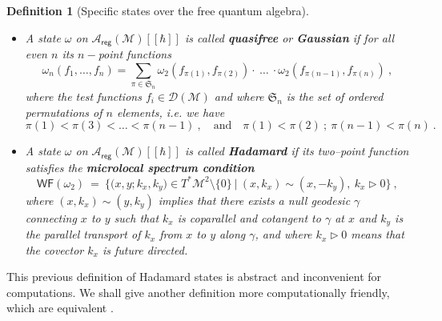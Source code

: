 \documentclass[11pt]{book}
\newcommand{\WF}{\mathsf{WF}}
\newcommand{\reg}{\mathsf{reg}}
\newcommand{\Acal}{\mathcal{A}}
\newcommand{\Dcal}{\mathcal{D}}
\newcommand{\Mcal}{\mathcal{M}}
\newcommand{\Srak}{\mathfrak{S}}
\theoremstyle{break}
\newtheorem{definition}{Definition}[chapter]
\begin{document}
\begin{definition}[Specific states over the free quantum algebra]
%
\begin{itemize}
\setlength\itemsep{0pt}
\item A state $\omega$ on $\Acal_\reg(\Mcal)[[\hbar]]$ is called \textbf{quasifree} or \textbf{Gaussian} if for all even $n$ its $n-$point functions
%
\begin{equation*}
\omega_n\left(f_1,  \dots , f_n  \right) =  \sum_{\pi \in \Srak_n} \omega_2\left( f_{\pi(1)}, f_{\pi(2)} \right) \cdot \ \dots \ \cdot \omega_2\left( f_{\pi(n-1)}, f_{\pi(n)} \right) \ ,
\end{equation*}
%
where the test functions $f_i \in \Dcal(\Mcal)$ and where $\Srak_n$ is the set of ordered permutations of $n$ elements, i.e. we have 
%
\begin{equation*}
\pi(1) < \pi(3) < \dots < \pi(n-1) \ , \quad \mbox{and} \quad \pi(1) < \pi(2) \ ;  \ \pi(n-1) < \pi(n) \ . 
\end{equation*}
%
%
%
\item A state $\omega$ on $\Acal_\reg(\Mcal)[[\hbar]]$ is called \textbf{Hadamard} if its two--point function satisfies the \textbf{microlocal spectrum condition}
%
\begin{equation}
\WF(\omega_2) \ = \ \bigg\{ \bigg( x, y ; k_x, k_y \bigg) \in T^\ast\Mcal^2 \setminus \{0\} \ \bigg| \ (x,k_x) \sim (x,-k_y), \ k_x \triangleright 0 \bigg\} \ ,
\label{eq:microlocal_spectrum_condition}
\end{equation}
%
where $(x,k_x) \sim (y,k_y)$ implies that there exists a null geodesic $\gamma$ connecting $x$ to $y$ such that $k_x$ is coparallel and cotangent to $\gamma$ at $x$ and $k_y$ is the parallel transport of $k_x$ from $x$ to $y$ along $\gamma$, and where $k_x \triangleright 0$ means that the covector $k_x$ is future directed.
\end{itemize}
\end{definition}


This previous definition of Hadamard states is abstract and inconvenient for computations. We shall give another definition more computationally friendly, which are equivalent \cite{RADZIKOWSKI_1996}.
\end{document}

